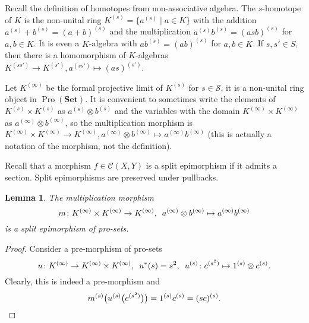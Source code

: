 \documentclass{article}
\newtheorem{lemma}{Lemma}
\newcommand{\rar}{\rightarrow}
\newcommand{\Set}{\mathbf{Set}}
\DeclareMathOperator{\Pro}{Pro}
\begin{document}
Recall the definition of homotopes from non-associative algebra. The \(s\)-homotope of \(K\) is the non-unital ring \(K^{(s)} = \{a^{(s)} \mid a \in K\}\) with the addition \(a^{(s)} + b^{(s)} = (a + b)^{(s)}\) and the multiplication \(a^{(s)} b^{(s)} = (asb)^{(s)}\) for \(a, b \in K\). It is even a \(K\)-algebra with \(ab^{(s)} = (ab)^{(s)}\) for \(a, b \in K\). If \(s, s' \in S\), then there is a homomorphism of \(K\)-algebras \(K^{(ss')} \rar K^{(s')}, a^{(ss')} \mapsto (as)^{(s')}\).

Let \(K^{(\infty)}\) be the formal projective limit of \(K^{(s)}\) for \(s \in \mathcal S\), it is a non-unital ring object in \(\Pro(\Set)\). It is convenient to sometimes write the elements of \(K^{(s)} \times K^{(s)}\) as \(a^{(s)} \otimes b^{(s)}\) and the variables with the domain \(K^{(\infty)} \times K^{(\infty)}\) as \(a^{(\infty)} \otimes b^{(\infty)}\), so the multiplication morphism is \(K^{(\infty)} \times K^{(\infty)} \rar K^{(\infty)}, a^{(\infty)} \otimes b^{(\infty)} \mapsto a^{(\infty)} b^{(\infty)}\) (this is actually a notation of the morphism, not the definition).

Recall that a morphism \(f \in \mathcal C(X, Y)\) is a split epimorphism if it admits a section. Split epimorphisms are preserved under pullbacks.

\begin{lemma}\label{RingGeneration}
The multiplication morphism
\[m \colon K^{(\infty)} \times K^{(\infty)} \rar K^{(\infty)}, \enskip a^{(\infty)} \otimes b^{(\infty)} \mapsto a^{(\infty)} b^{(\infty)}\]
is a split epimorphism of pro-sets.
\end{lemma}
\begin{proof}
Consider a pre-morphism of pro-sets
\[u \colon K^{(\infty)} \rar K^{(\infty)} \times K^{(\infty)}, \enskip u^*(s) = s^2, \enskip u^{(s)} \colon c^{(s^2)} \mapsto 1^{(s)} \otimes c^{(s)}.\]
Clearly, this is indeed a pre-morphism and
\[
m^{(s)}\bigl(u^{(s)}\bigl(c^{(s^2)}\bigr)\bigr) = 1^{(s)} c^{(s)} = (sc)^{(s)}.\qedhere
\]
\end{proof}
\end{document}
